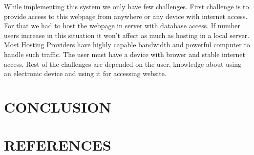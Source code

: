 \documentclass[a4paper,12pt]{report}
\begin{document}
While implementing this system we only have few challenges. First challenge is to provide access to this webpage from anywhere or any device with internet access. For that we had to host the webpage in server with database access. If number users increase in this situation it won't affect as much as hosting in a local server. Most Hosting Providers have highly capable bandwidth and powerful computer to handle such traffic. The user must have a device with brower and stable internet access. Rest of the challenges are depended on the user, knowledge about using an electronic device and using it for accessing website. \\

\pagebreak

\chapter{CONCLUSION}

\pagebreak

\chapter{REFERENCES}
\end{document}
